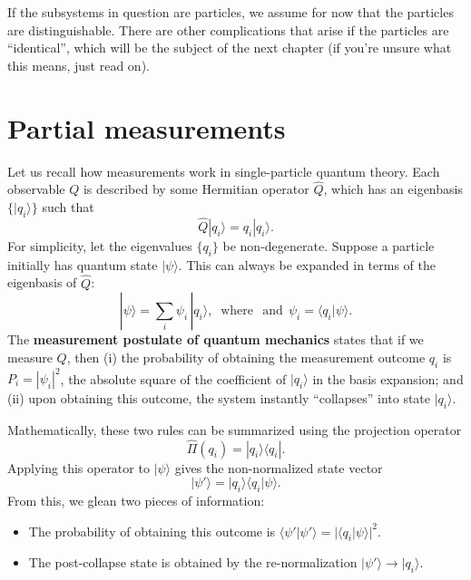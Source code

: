 \documentclass[pra,12pt]{revtex4}
\begin{document}

If the subsystems in question are particles, we assume for now that
the particles are distinguishable.  There are other complications that
arise if the particles are ``identical'', which will be the subject of
the next chapter (if you're unsure what this means, just read on).

\section{Partial measurements}
\label{sec:partialmeasurements}

Let us recall how measurements work in single-particle quantum theory.
Each observable $Q$ is described by some Hermitian operator $\hat{Q}$,
which has an eigenbasis $\{|q_i\rangle\}$ such that
\begin{equation}
  \hat{Q}|q_i\rangle = q_i |q_i\rangle.
\end{equation}
For simplicity, let the eigenvalues $\{q_i\}$ be non-degenerate.
Suppose a particle initially has quantum state $|\psi\rangle$.  This
can always be expanded in terms of the eigenbasis of $\hat{Q}$:
\begin{equation}
  |\psi\rangle = \sum_i \psi_i\, |q_i\rangle, \;\;\mathrm{where}\;\;\,\textrm{and}\;\, \psi_i = \langle q_i|\psi\rangle.
\end{equation}
The \textbf{measurement postulate of quantum mechanics} states that if
we measure $Q$, then (i) the probability of obtaining the measurement
outcome $q_i$ is $P_i = |\psi_i|^2$, the absolute square of the
coefficient of $|q_i\rangle$ in the basis expansion; and (ii) upon
obtaining this outcome, the system instantly ``collapses'' into state
$|q_i\rangle$.

Mathematically, these two rules can be summarized using the projection
operator
\begin{equation}
  \hat{\Pi}(q_i) = |q_i\rangle\langle q_i|.
\end{equation}
Applying this operator to $|\psi\rangle$ gives the non-normalized
state vector
\begin{equation}
  |\psi'\rangle = |q_i\rangle \langle q_i|\psi\rangle.
\end{equation}
From this, we glean two pieces of information:
\begin{itemize}
\item The probability of obtaining this outcome is
  $\langle\psi'|\psi'\rangle = |\langle q_i|\psi\rangle|^2$.

\item The post-collapse state is obtained by the re-normalization
  $|\psi'\rangle \rightarrow |q_i\rangle$.
\end{itemize}
\end{document}
